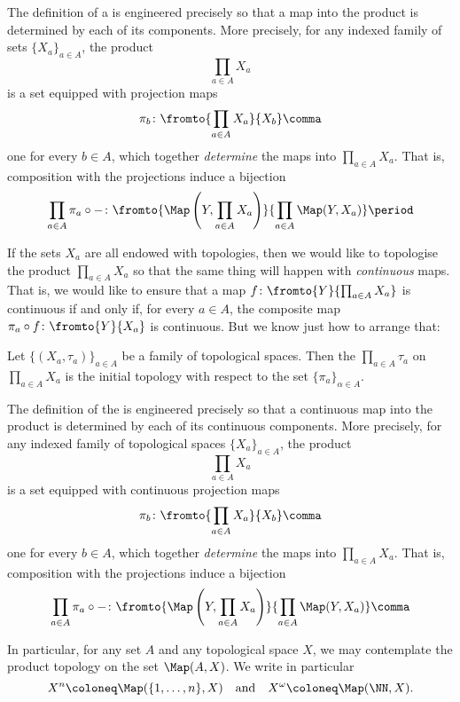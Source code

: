 
\begin{nul}
	The definition of a  is engineered precisely so that a map into the product is determined by each of its components.
	More precisely, for any indexed family of sets $\{X_a\}_{a\in A}$, the product
	\[
		\prod_{a\in A}X_a
	\]
	is a set equipped with projection maps
	\[
		\pi_b\colon\fromto{\prod_{a\in A}X_a}{X_b} \comma
	\]
	one for every $b\in A$, which together \emph{determine} the maps into $\prod_{a\in A}X_a$.
	That is, composition with the projections induce a bijection
	\[
		\prod_{a\in A}\pi_{a}\circ -\colon\fromto{\Map\left(Y,\prod_{a\in A}X_a\right)}{\prod_{a\in A}\Map(Y,X_a)} \period
\]
\end{nul}

If the sets $X_a$ are all endowed with topologies, then we would like to topologise the product $\prod_{a\in A}X_a$ so that the same thing will happen with \emph{continuous} maps.
That is, we would like to ensure that a map $f\colon\fromto{Y}{\prod_{a\in A}X_a}$ is continuous if and only if, for every $a\in A$, the composite map $\pi_a\circ f\colon\fromto{Y}{X_a}$ is continuous.
But we know just how to arrange that:

\begin{dfn}
	Let $\{(X_a,\tau_a)\}_{a\in A}$ be a family of topological spaces.
	Then the  $\prod_{a\in A}\tau_a$ on $\prod_{a\in A}X_a$ is the initial topology with respect to the set $\{\pi_a\}_{\alpha\in A}$.
\end{dfn}

\begin{nul}
	The definition of the  is engineered precisely so that a continuous map into the product is determined by each of its continuous components.
	More precisely, for any indexed family of topological spaces $\{X_a\}_{a\in A}$, the product
	\[
		\prod_{a\in A}X_a
	\]
	is a set equipped with continuous projection maps
	\[
		\pi_b\colon\fromto{\prod_{a\in A}X_a}{X_b} \comma
	\]
	one for every $b\in A$, which together \emph{determine} the maps into $\prod_{a\in A}X_a$.
	That is, composition with the projections induce a bijection
	\[
		\prod_{a\in A}\pi_{a}\circ -\colon\fromto{\Map\left(Y,\prod_{a\in A}X_a\right)}{\prod_{a\in A}\Map(Y,X_a)} \comma
	\]
\end{nul}

\begin{exm}
	In particular, for any set $A$ and any topological space $X$, we may contemplate the product topology on the set $\Map(A,X)$.
	We write in particular
	\[
		X^n\coloneq\Map(\{1,\dots,n\},X)\text{\quad and\quad}X^{\omega}\coloneq\Map(\NN,X).
	\]
\end{exm}

